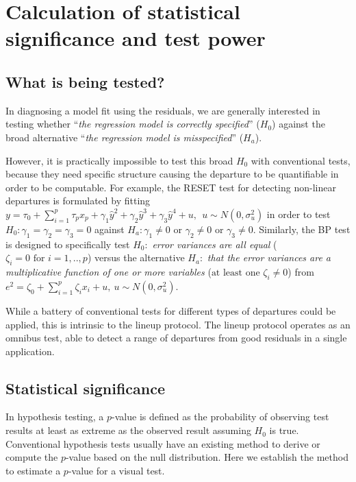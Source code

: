\documentclass[]{interact}
\theoremstyle{plain}%
\theoremstyle{definition}
\theoremstyle{remark}
\begin{document}
\hypertarget{significance-calculation}{%
\section{Calculation of statistical significance and test
power}\label{significance-calculation}}

\hypertarget{what-is-being-tested}{%
\subsection{What is being tested?}\label{what-is-being-tested}}

In diagnosing a model fit using the residuals, we are generally
interested in testing whether ``\emph{the regression model is correctly
specified}'' (\(H_0\)) against the broad alternative ``\emph{the
regression model is misspecified}'' (\(H_a\)).

However, it is practically impossible to test this broad \(H_0\) with
conventional tests, because they need specific structure causing the
departure to be quantifiable in order to be computable. For example, the
RESET test for detecting non-linear departures is formulated by fitting
\(y = \tau_0 + \sum_{i=1}^{p}\tau_px_p +\gamma_1\hat{y}^2 + \gamma_2\hat{y}^3 + \gamma_3\hat{y}^4 + u, ~~u \sim N(0, \sigma_u^2)\)
in order to test \(H_0:\gamma_1 = \gamma_2 = \gamma_3 = 0\) against
\(H_a: \gamma_1 \neq 0 \text{ or } \gamma_2 \neq 0 \text{ or } \gamma_3 \neq 0\).
Similarly, the BP test is designed to specifically test \(H_0:\)
\emph{error variances are all equal}
(\(\zeta_i=0 \text{ for } i=1,..,p\)) versus the alternative \(H_a:\)
\emph{that the error variances are a multiplicative function of one or
more variables} (\(\text{at least one } \zeta_i\neq 0\)) from
\(e^2 = \zeta_0 + \sum_{i=1}^{p}\zeta_i x_i + u, ~ u\sim N(0,\sigma_u^2)\).

While a battery of conventional tests for different types of departures
could be applied, this is intrinsic to the lineup protocol. The lineup
protocol operates as an omnibus test, able to detect a range of
departures from good residuals in a single application.

\hypertarget{statistical-significance}{%
\subsection{\texorpdfstring{Statistical
significance\label{sig}}{Statistical significance}}\label{statistical-significance}}

In hypothesis testing, a \(p\)-value is defined as the probability of
observing test results at least as extreme as the observed result
assuming \(H_0\) is true. Conventional hypothesis tests usually have an
existing method to derive or compute the \(p\)-value based on the null
distribution. Here we establish the method to estimate a \(p\)-value for
a visual test.
\end{document}
